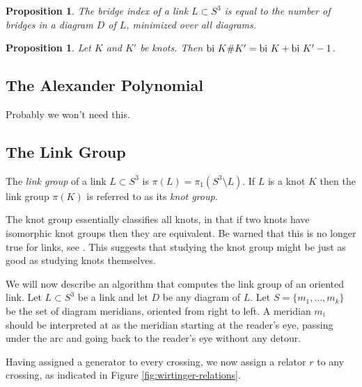 \documentclass{article}
\newtheorem{proposition}[theorem]{Proposition}
\theoremstyle{definition}
\begin{document}
\begin{proposition}
The bridge index of a link $L \subset S^3$ is equal to the number of bridges in a diagram $D$ of $L$, minimized over all diagrams.
\end{proposition}


\begin{proposition}\label{prop:bridge-index-connected-sum}
Let $K$ and $K'$ be knots. Then $\textup{bi } K\#K' = \textup{bi } K + \textup{bi }K' - 1$.
\end{proposition}

\subsection{The Alexander Polynomial}
Probably we won't need this.

\subsection{The Link Group}\label{subsec:link-group}
The \textit{link group} of a link $L \subset S^3$ is $\pi(L) = \pi_1(S^3 \setminus L)$. If $L$ is a knot $K$ then the link group $\pi(K)$ is referred to as its \textit{knot group}.

The knot group essentially classifies all knots, in that if two knots have isomorphic knot groups then they are equivalent. Be warned that this is no longer true for links, see \cite{rolfsen2003}. This suggests that studying the knot group might be just as good as studying knots themselves.

We will now describe an algorithm that computes the link group of an oriented link. Let $L \subset S^3$ be a link and let $D$ be any diagram of $L$. Let $S = \{m_1, \dots, m_k\}$ be the set of diagram meridians, oriented from right to left. A meridian $m_i$ should be interpreted at as the meridian starting at the reader's eye, passing under the arc and going back to the reader's eye without any detour.

Having assigned a generator to every crossing, we now assign a relator $r$ to any crossing, as indicated in Figure \ref{fig:wirtinger-relations}.
\end{document}
